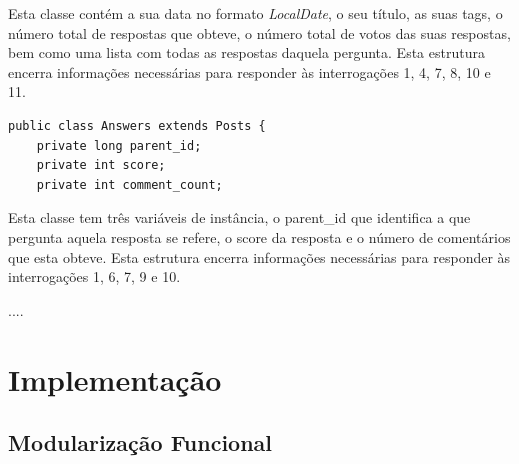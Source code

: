\documentclass[a4paper]{article}
\begin{document}
Esta classe contém a sua data no formato \textit{LocalDate}, o seu título,
as suas tags, o número total de respostas que obteve, o número total de votos
das suas respostas, bem como uma lista com todas as respostas daquela pergunta.
Esta estrutura encerra informações necessárias para responder às interrogações 1,
4, 7, 8, 10 e 11.


\begin{verbatim}
public class Answers extends Posts {
    private long parent_id;
    private int score;
    private int comment_count;
\end{verbatim}

Esta classe tem três variáveis de instância, o parent\_id que identifica a que
pergunta aquela resposta se refere, o score da resposta e o número de comentários
que esta obteve.
Esta estrutura encerra informações necessárias para responder às interrogações 1,
6, 7, 9 e 10.


....


\section{Implementação}
\label{sec:implementacao}

\subsection{Modularização Funcional}
\label{sec:organizacao}
\end{document}
